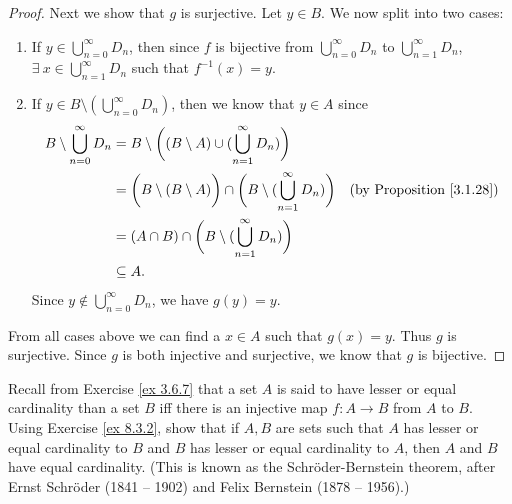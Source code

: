 \begin{proof}
    Next we show that \(g\) is surjective.
    Let \(y \in B\).
    We now split into two cases:
    \begin{enumerate}
        \item If \(y \in \bigcup_{n = 0}^\infty D_n\), then since \(f\) is bijective from \(\bigcup_{n = 0}^\infty D_n\) to \(\bigcup_{n = 1}^\infty D_n\), \(\exists\ x \in \bigcup_{n = 1}^\infty D_n\) such that \(f^{-1}(x) = y\).
        \item If \(y \in B \setminus (\bigcup_{n = 0}^\infty D_n)\), then we know that \(y \in A\) since
              \begin{align*}
                  B \setminus \bigcup_{n = 0}^\infty D_n & = B \setminus \bigg((B \setminus A) \cup (\bigcup_{n = 1}^\infty D_n)\bigg)                                                                \\
                                                         & = \bigg(B \setminus (B \setminus A)\bigg) \cap \bigg(B \setminus (\bigcup_{n = 1}^\infty D_n)\bigg) & \text{(by Proposition \ref{3.1.28})} \\
                                                         & = (A \cap B) \cap \bigg(B \setminus (\bigcup_{n = 1}^\infty D_n)\bigg)                                                                     \\
                                                         & \subseteq A.
              \end{align*}
              Since \(y \notin \bigcup_{n = 0}^\infty D_n\), we have \(g(y) = y\).
    \end{enumerate}
    From all cases above we can find a \(x \in A\) such that \(g(x) = y\).
    Thus \(g\) is surjective.
    Since \(g\) is both injective and surjective, we know that \(g\) is bijective.
\end{proof}

\begin{exercise}\label{ex 8.3.3}
    Recall from Exercise \ref{ex 3.6.7} that a set \(A\) is said to have lesser or equal cardinality than a set \(B\) iff there is an injective map \(f : A \to B\) from \(A\) to \(B\).
    Using Exercise \ref{ex 8.3.2}, show that if \(A, B\) are sets such that \(A\) has lesser or equal cardinality to \(B\) and \(B\) has lesser or equal cardinality to \(A\), then \(A\) and \(B\) have equal cardinality.
    (This is known as the Schröder-Bernstein theorem, after Ernst Schröder (1841 -- 1902) and Felix Bernstein (1878 -- 1956).)
\end{exercise}


